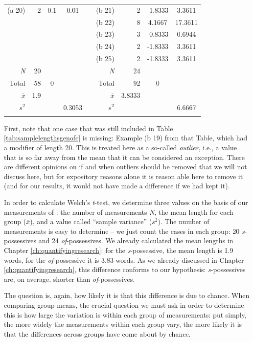 \begin{table}[!htbp]
\begin{tabular}[t]{rrcccrrcc}
(a 20) & 2 & 0.1 & 0.01 &  & (b 21) & 2 & -1.8333 & 3.3611 \\
 &  &  &  &  & (b 22) & 8 & 4.1667 & 17.3611 \\
 &  &  &  &  & (b 23) & 3 & -0.8333 & 0.6944 \\
 &  &  &  &  & (b 24) & 2 & -1.8333 & 3.3611 \\
 &  &  &  &  & (b 25) & 2 & -1.8333 & 3.3611 \\
\midrule
\textit{N} & 20 &  &  &  & \textit{N} & 24 &  &  \\
Total & 58 & 0 &  &  & Total & 92 & 0 &  \\
$\overline{x}$ & 1.9 &  &  &  & $\overline{x}$  & 3.8333 &  &  \\
$s^2$ &  &  & 0.3053 &  & $s^2$  &  &  & 6.6667 \\
\lspbottomrule
\end{tabular}
\end{table}

First, note that one case that was still included in Table \ref{tab:samplelengthsgenofc} is missing: Example (b 19) from that Table, which had a modifier of length 20. This is treated here as a so-called \emph{outlier}, i.e., a value that is so far away from the mean that it can be considered an exception. There are different opinions on if and when outliers should be removed that we will not discuss here, but for expository reasons alone it is reason able here to remove it (and for our results, it would not have made a difference if we had kept it).

In order to calculate Welch's \textit{t}-test, we determine three values on the basis of our measurements of : the number of measurements \textit{N}, the mean length for each group ($\overline{x}$), and a value called ``sample variance'' ($s^2$). The number of measurements is easy to determine -- we just count the cases in each group: 20 \textit{s}-possessives and 24 \textit{of}-possessives. We already calculated the mean lengths in Chapter \ref{ch:quantifyingresearch}: for the \textit{s}-possessive, the mean length is 1.9 words, for the \textit{of}-possessive it is 3.83 words. As we already discussed in Chapter \ref{ch:quantifyingresearch}, this difference conforms to our hypothesis: \textit{s}-possessives are, on average, shorter than \textit{of}-possessives.

The question is, again, how likely it is that this difference is due to chance. When comparing group means, the crucial question we must ask in order to determine this is how large the variation is within each group of measurements: put simply, the more widely the measurements within each group vary, the more likely it is that the differences across groups have come about by chance.

